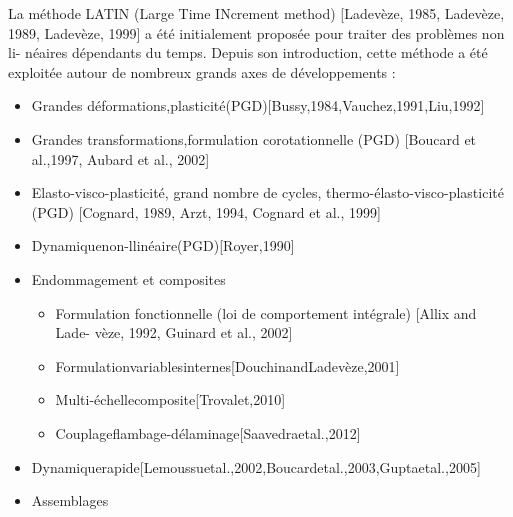 \documentclass[12pt,a4paper]{report}
\begin{document}
  
La méthode LATIN (Large Time INcrement method) [Ladevèze, 1985, Ladevèze, 1989, Ladevèze, 1999] a été initialement proposée pour traiter des problèmes non li- néaires dépendants du temps. Depuis son introduction, cette méthode a été exploitée autour de nombreux grands axes de développements :
  \begin{itemize}
  \item Grandes déformations,plasticité(PGD)[Bussy,1984,Vauchez,1991,Liu,1992]
  \item Grandes transformations,formulation corotationnelle (PGD) [Boucard et al.,1997, Aubard et al., 2002]
  \item Elasto-visco-plasticité, grand nombre de cycles, thermo-élasto-visco-plasticité (PGD) [Cognard, 1989, Arzt, 1994, Cognard et al., 1999]
  \item Dynamiquenon-llinéaire(PGD)[Royer,1990]
  \item Endommagement et composites
  	\begin{itemize}
  		\item Formulation fonctionnelle (loi de comportement intégrale) [Allix and Lade- vèze, 1992, Guinard et al., 2002]
	 	\item Formulationvariablesinternes[DouchinandLadevèze,2001]  \item Multi-échellecomposite[Trovalet,2010]
	 	\item Couplageflambage-délaminage[Saavedraetal.,2012]
  	\end{itemize}  
  	\item Dynamiquerapide[Lemoussuetal.,2002,Boucardetal.,2003,Guptaetal.,2005]
    \item Assemblages
    

\end{itemize}
\end{document}
